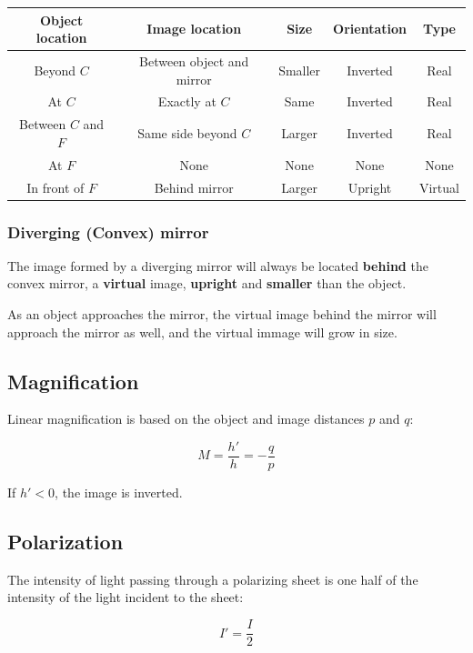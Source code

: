 \documentclass[12pt]{article}
\begin{document}
\begin{center}
\begin{tabular}{ |c|c|c|c|c| } 
 \hline
 Object location & Image location & Size & Orientation & Type\\
 \hline
 \hline
 Beyond $C$ & Between object and mirror & Smaller & Inverted & Real\\
 \hline
 At $C$ & Exactly at $C$ & Same & Inverted & Real\\
 \hline
 Between $C$ and $F$ & Same side beyond $C$ & Larger & Inverted & Real\\
 \hline
 At $F$ & None & None & None & None\\
 \hline
 In front of $F$ & Behind mirror & Larger & Upright & Virtual\\
 \hline
\end{tabular}
\end{center}

\subsubsection{Diverging (Convex) mirror} 

The image formed by a diverging mirror will always be located \textbf{behind} the convex mirror, a \textbf{virtual} image, \textbf{upright} and \textbf{smaller} than the object.

As an object approaches the mirror, the virtual image behind the mirror will approach the mirror as well, and the virtual immage will grow in size.

\newpage

\subsection{Magnification}

Linear magnification is based on the object and image distances $p$ and $q$:

\[
\boxed{
M = \frac{h'}{h} = -\frac{q}{p}
}
\]

If $h' < 0$, the image is inverted.

\subsection{Polarization}

The intensity of light passing through a polarizing sheet is one half of the intensity of the light incident to the sheet:

\[
\boxed{
I' = \frac{I}{2}
}
\]
\end{document}
